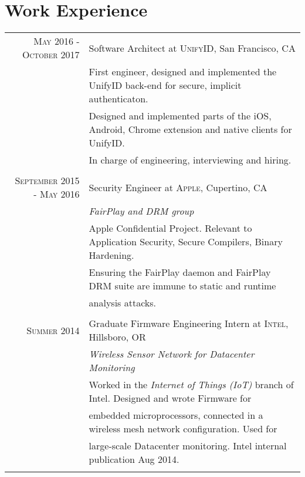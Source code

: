 \documentclass[lettersize,10pt]{article}
\begin{document}
\section{Work Experience}
\begin{tabular}{rl}
\textsc{ May 2016 - October 2017} & Software Architect at \textsc{UnifyID}, San Francisco, CA\\
&\footnotesize{First engineer, designed and implemented the UnifyID back-end for secure, implicit authenticaton. }\\
&\footnotesize{Designed and implemented parts of the iOS, Android, Chrome extension and native clients for UnifyID.}\\
&\footnotesize{In charge of engineering, interviewing and hiring.}\\\multicolumn{2}{c}{} \\

\textsc{September 2015 - May 2016} & Security Engineer at \textsc{Apple}, Cupertino, CA \\&\emph{FairPlay and DRM group}\\
&\footnotesize{Apple Confidential Project. Relevant to Application Security, Secure Compilers, Binary Hardening.} \\
&\footnotesize{Ensuring the FairPlay daemon and FairPlay DRM suite are immune to static and runtime }\\
&\footnotesize{analysis attacks.}\\\multicolumn{2}{c}{} \\

\textsc{Summer 2014} & Graduate Firmware Engineering Intern at \textsc{Intel}, Hillsboro, OR \\&\emph{Wireless Sensor Network for Datacenter Monitoring}\\
&\footnotesize{Worked in the \textit{Internet of Things (IoT)} branch of Intel. Designed and wrote Firmware for} \\
&\footnotesize{embedded microprocessors, connected in a wireless mesh network configuration. Used for} \\
&\footnotesize{large-scale Datacenter monitoring. Intel internal publication Aug 2014.}\\\multicolumn{2}{c}{} \\
\end{tabular}

\end{document}
